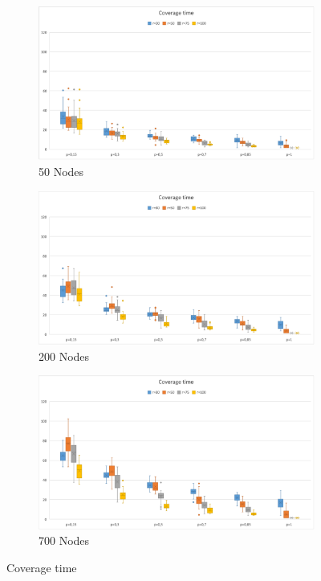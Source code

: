 \begin{figure}
\begin{subfigure}{0.35\hsize}\centering
    \includegraphics[width=1\hsize]{./images/Time50Boxplot.png}
\caption{50 Nodes}
    \label{fig:sub1}
\end{subfigure}%
\begin{subfigure}{0.35\hsize}\centering
    \includegraphics[width=1\hsize]{./images/Time200BoxplotScaled.png}
\caption{200 Nodes}
    \label{fig:sub2}
\end{subfigure}
\begin{subfigure}{0.35\hsize}\centering
    \includegraphics[width=1\hsize]{./images/Time700Boxplot.png}
\caption{700 Nodes}
    \label{fig:sub2}
\end{subfigure}
\caption{Coverage time}
\end{figure}


